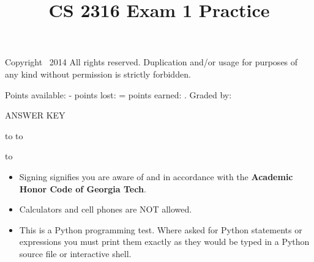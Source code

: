 \documentclass[addpoints,9pt]{exam}
\title{CS 2316 Exam 1 Practice}
\date{}
\begin{document}
\maketitle
\thispagestyle{head}


\runningheader{}
              {\tiny Copyright \textcopyright\ 2014 All rights reserved. Duplication and/or usage for purposes of any kind without permission is strictly forbidden.}
              {}

              {}
              {Points available: \pointsonpage{\thepage} -
               points lost: \makebox[.5in]{\hrulefill} =
               points earned:  \makebox[.5in]{\hrulefill}.
              Graded by: \makebox[.5in]{\hrulefill}}


\ifprintanswers
\begin{center}
{\LARGE ANSWER KEY}
\end{center}
\else
\vspace{0.1in}
\hbox to \textwidth{Name (print clearly): \enspace\hrulefill}
\vspace{0.3in}
\hbox to \textwidth{Signature: \hrulefill}

\vspace{0.3in}
\hbox to \textwidth{GT account username (gtg, gth, msmith3, etc): \enspace\hrulefill}

\fi

\vfill

\begin{itemize}
\item Signing signifies you are aware of and in accordance with the {\bf Academic Honor Code of Georgia Tech}.
\item Calculators and cell phones are NOT allowed.
\item This is a Python programming test.  Where asked for Python statements or expressions you must print them exactly as they would be typed in a Python source file or interactive shell.
\end{itemize}

\vfill

\addpoints
\end{document}
